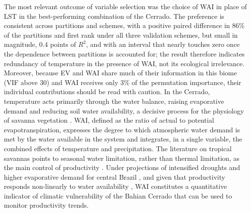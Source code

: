\documentclass[a4paper,fleqn]{cas-sc}
\begin{document}
The most relevant outcome of variable selection was the choice of WAI in place of LST in the best-performing combination of the Cerrado. The preference is consistent across partitions and schemes, with a positive paired difference in 86\% of the partitions and first rank under all three validation schemes, but small in magnitude, 0.4 points of $R^2$, and with an interval that nearly touches zero once the dependence between partitions is accounted for; the result therefore indicates redundancy of temperature in the presence of WAI, not its ecological irrelevance. Moreover, because EV and WAI share much of their information in this biome (VIF above 30) and WAI receives only 3\% of the permutation importance, their individual contributions should be read with caution. In the Cerrado, temperature acts primarily through the water balance, raising evaporative demand and reducing soil water availability, a decisive process for the physiology of savanna vegetation \citep{bucci2008,arruda2016}. WAI, defined as the ratio of actual to potential evapotranspiration, expresses the degree to which atmospheric water demand is met by the water available in the system and integrates, in a single variable, the combined effects of temperature and precipitation. The literature on tropical savannas points to seasonal water limitation, rather than thermal limitation, as the main control of productivity \citep{vourlitis2022}. Under projections of intensified droughts and higher evaporative demand for central Brazil \citep{ipcc2022}, and given that productivity responds non-linearly to water availability \citep{mwangi2025}, WAI constitutes a quantitative indicator of climatic vulnerability of the Bahian Cerrado that can be used to monitor productivity trends.
\end{document}
